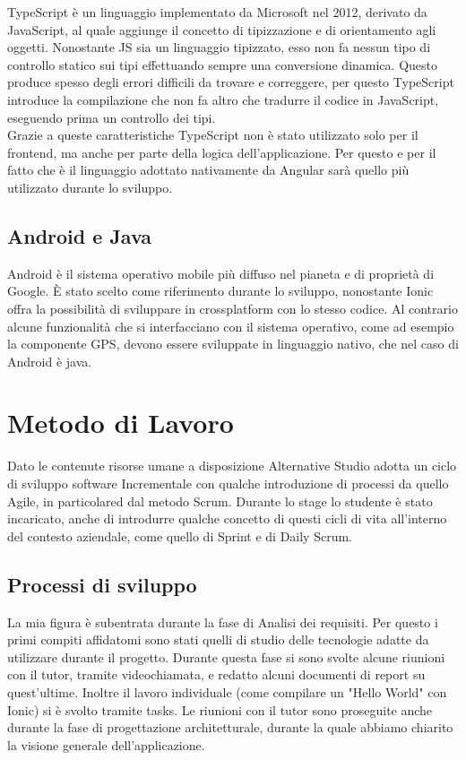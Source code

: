 TypeScript è un linguaggio implementato da Microsoft nel 2012, derivato da JavaScript, al quale aggiunge il concetto di tipizzazione e di orientamento agli oggetti. Nonostante JS sia un linguaggio \gls{tipizzato}, esso non fa nessun tipo di controllo statico sui tipi effettuando sempre una conversione dinamica. Questo produce spesso degli errori difficili da trovare e correggere, per questo TypeScript introduce la compilazione che non fa altro che tradurre il codice in JavaScript, eseguendo prima un controllo dei tipi.\\
Grazie a queste caratteristiche TypeScript non è stato utilizzato solo per il \gls{frontend}, ma anche per parte della logica dell'applicazione. Per questo e per il fatto che è il linguaggio adottato nativamente da Angular sarà quello più utilizzato durante lo sviluppo.

\subsection{Android e Java}

\gls{Android} è il sistema operativo mobile più diffuso nel pianeta e di proprietà di \gls{Google}. È stato scelto come riferimento durante lo sviluppo, nonostante \gls{Ionic} offra la possibilità di sviluppare in crossplatform con lo stesso codice. Al contrario alcune funzionalità che si interfacciano con il sistema operativo, come ad esempio la componente GPS, devono essere sviluppate in linguaggio nativo, che nel caso di \gls{Android} è \gls{java}.


\section{Metodo di Lavoro}
Dato le contenute risorse umane a disposizione Alternative Studio adotta un ciclo di sviluppo software \gls{Incrementale} con qualche introduzione di processi da quello \gls{Agile}, in particolared dal metodo \gls{Scrum}. Durante lo stage lo studente è stato incaricato, anche di introdurre qualche concetto di questi cicli di vita all'interno del contesto aziendale, come quello di \gls{Sprint} e di \gls{Daily Scrum}.

\subsection{Processi di sviluppo}
La mia figura è subentrata durante la fase di Analisi dei requisiti. Per questo i primi compiti affidatomi sono stati quelli di studio delle tecnologie adatte da utilizzare durante il progetto. Durante questa fase si sono svolte alcune riunioni con il tutor, tramite videochiamata, e redatto alcuni documenti di report su quest'ultime. Inoltre il lavoro individuale (come compilare un "Hello World" con Ionic) si è svolto tramite tasks. Le riunioni con il tutor sono proseguite anche durante la fase di progettazione architetturale, durante la quale abbiamo chiarito la visione generale dell'applicazione.

